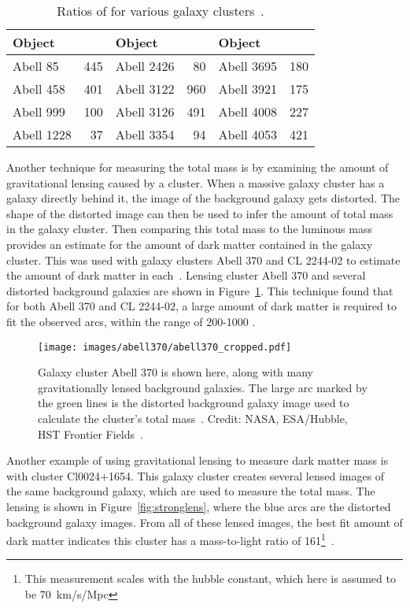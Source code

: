\begin{table}
  \centering
  \caption[Ratios of \MLsol for Various Galaxy Clusters]{
    Ratios of \MLsol for various galaxy clusters~\cite{cluster_ml_ratios}.
    }
  \label{tab:cluster_ml_ratios}
  \begin{tabular}{l r | l r | l r}
    Object & \mlratio{} & Object & \mlratio{} & Object & \mlratio{} \\
    \hline
    Abell   85 & 445 & Abell 2426 &  80 & Abell 3695 & 180 \\
    Abell  458 & 401 & Abell 3122 & 960 & Abell 3921 & 175 \\
    Abell  999 & 100 & Abell 3126 & 491 & Abell 4008 & 227 \\
    Abell 1228 &  37 & Abell 3354 &  94 & Abell 4053 & 421 \\
  \end{tabular}
\end{table}
    
Another technique for measuring the total mass is by examining the amount of gravitational lensing caused by a cluster.
When a massive galaxy cluster has a galaxy directly behind it, the image of the background galaxy gets distorted.
The shape of the distorted image can then be used to infer the amount of total mass in the galaxy cluster.
Then comparing this total mass to the luminous mass provides an estimate for the amount of dark matter contained in the galaxy cluster.
This was used with galaxy clusters Abell 370 and CL 2244-02 to estimate the amount of dark matter in each~\cite{cluster_lensing}.
Lensing cluster Abell 370 and several distorted background galaxies are shown in Figure~\ref{fig:abell370}.
This technique found that for both Abell 370 and CL 2244-02, a large amount of dark matter is required to fit the observed arcs, within the range of 200-1000 \MLsol.
    
\begin{figure}
  \centering
  \texttt{[image: images/abell370/abell370\_cropped.pdf]}
  \caption[Gravitational Lensing in Abell 370]{
    Galaxy cluster Abell 370 is shown here, along with many gravitationally lensed background galaxies.
    The large arc marked by the green lines is the distorted background galaxy image used to calculate the cluster's total mass~\cite{cluster_lensing}.
    Credit: NASA, ESA/Hubble, HST Frontier Fields~\cite{abell370_hubble}.
  }
  \label{fig:abell370}
\end{figure}
    
Another example of using gravitational lensing to measure dark matter mass is with cluster Cl0024+1654.
This galaxy cluster creates several lensed images of the same background galaxy, which are used to measure the total mass.
The lensing is shown in Figure~\ref{fig:stronglens}, where the blue arcs are the distorted background galaxy images.
From all of these lensed images, the best fit amount of dark matter indicates this cluster has a mass-to-light ratio of \SI{161}{}\MLsol{}\footnote[3]{This measurement scales with the hubble constant, which here is assumed to be \SI{70}{km/s/Mpc}}~\cite{cluster_strong_lensing_1996, cluster_strong_lensing_1998, cluster_strong_lensing_2010}.
    
